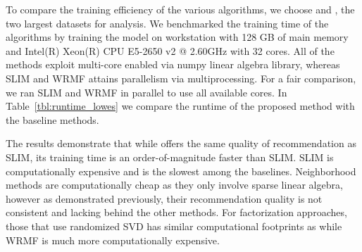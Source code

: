 
To compare the training efficiency of the various algorithms, we choose \Lowes and \MLens, the two largest datasets for analysis.
We benchmarked the training time of the algorithms
by training the model on  workstation with 128 GB of main memory and Intel(R) Xeon(R) CPU E5-2650 v2 @ 2.60GHz with 32 cores. All of the methods exploit multi-core enabled via numpy linear algebra library, whereas SLIM and WRMF attains parallelism via multiprocessing. For a fair comparison, we ran  SLIM and WRMF in parallel to use all available cores.  In Table~\ref{tbl:runtime_lowes} we compare the runtime of the proposed method with the baseline methods.

The results demonstrate that while \LinearLow offers the same quality of recommendation as SLIM, its training time is an order-of-magnitude
faster than SLIM.  SLIM is computationally expensive and is the slowest among the baselines.
Neighborhood methods are computationally cheap as they only involve sparse linear algebra, however as demonstrated previously, their recommendation
quality is not consistent and lacking behind the other methods.
For factorization approaches, those that use randomized SVD has similar computational footprints as \LinearLow while
WRMF is much more computationally expensive.
\begin{table}[H]
\caption{Training time on the  \Lowes  and \MLens Dataset.}
\label{tbl:runtime_lowes}
\centering
{}
\end{table}



